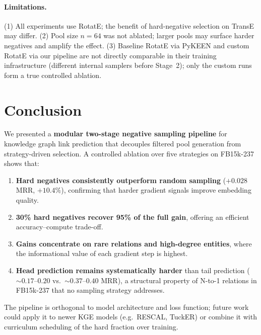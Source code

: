 \documentclass[10pt,twocolumn,letterpaper]{article}
\begin{document}
\paragraph{Limitations.}
(1) All experiments use RotatE; the benefit of hard-negative selection on
TransE may differ.
(2) Pool size $n=64$ was not ablated; larger pools may surface harder
negatives and amplify the effect.
(3) Baseline RotatE via PyKEEN and custom RotatE via our pipeline are not
directly comparable in their training infrastructure (different internal
samplers before Stage~2); only the custom runs form a true controlled ablation.

\section{Conclusion}
\label{sec:conclusion}

We presented a \textbf{modular two-stage negative sampling pipeline} for
knowledge graph link prediction that decouples filtered pool generation
from strategy-driven selection. A controlled ablation over five strategies
on FB15k-237 shows that:

\begin{enumerate}
  \item \textbf{Hard negatives consistently outperform random sampling}
    ($+0.028$ MRR, $+10.4\%$), confirming that harder gradient signals
    improve embedding quality.
  \item \textbf{30\% hard negatives recover 95\% of the full gain},
    offering an efficient accuracy--compute trade-off.
  \item \textbf{Gains concentrate on rare relations and high-degree entities},
    where the informational value of each gradient step is highest.
  \item \textbf{Head prediction remains systematically harder} than tail
    prediction ($\sim\!0.17$--$0.20$ vs.\ $\sim\!0.37$--$0.40$ MRR),
    a structural property of N-to-1 relations in FB15k-237 that no
    sampling strategy addresses.
\end{enumerate}

The pipeline is orthogonal to model architecture and loss function; future
work could apply it to newer KGE models (e.g.\ RESCAL, TuckER) or combine
it with curriculum scheduling of the hard fraction over training.

\end{document}
